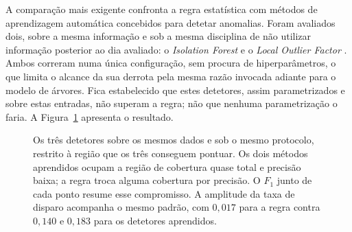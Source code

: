 A comparação mais exigente confronta a regra estatística com métodos de aprendizagem automática
concebidos para detetar anomalias. Foram avaliados dois, sobre a mesma informação e sob a mesma
disciplina de não utilizar informação posterior ao dia avaliado: o \emph{Isolation Forest}
\autocite{liu2008isolation} e o \emph{Local Outlier Factor} \autocite{breunig2000lof}. Ambos correram numa única configuração, sem procura de hiperparâmetros, o que limita o alcance da
sua derrota pela mesma razão invocada adiante para o modelo de árvores. Fica estabelecido que
estes detetores, assim parametrizados e sobre estas entradas, não superam a regra; não que nenhuma
parametrização o faria. A Figura~\ref{fig:av_detetores} apresenta o resultado.

\begin{figure}[ht]
\centering
{}
\caption[A regra transparente contra dois detetores aprendidos]{Os três detetores sobre os mesmos
dados e sob o mesmo protocolo, restrito à região que os três conseguem pontuar. Os dois métodos
aprendidos ocupam a região de cobertura quase total e precisão baixa; a regra troca alguma
cobertura por precisão. O $F_1$ junto de cada ponto resume esse compromisso. A amplitude da taxa de disparo acompanha o mesmo padrão, com
$0{,}017$ para a regra contra $0{,}140$ e $0{,}183$ para os detetores aprendidos.}
\label{fig:av_detetores}
\end{figure}

